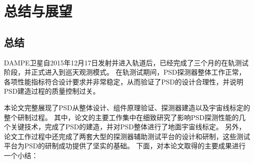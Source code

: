 
\chapter{总结与展望}
\label{ch:conclusion}

\section{总结}

DAMPE卫星自2015年12月17日发射并进入轨道后，已经完成了三个月的在轨测试阶段，并正式进入到巡天观测模式。
在轨测试期间，PSD探测器整体工作正常，各项性能指标符合设计要求并非常稳定，从而验证了PSD的设计合理性，并说明PSD建造过程的质量控制过关。

本论文完整展现了PSD从整体设计、组件原理验证、探测器建造以及宇宙线标定的整个研制过程。
其中，论文的主要工作集中在细致研究了影响PSD探测性能的几个关键技术，完成了PSD的建造，并对PSD整体进行了地面宇宙线标定。
另外，论文工作过程中还完成了两套大型的探测器辅助测试平台的设计和研制，这些测试平台为PSD的研制成功提供了坚实的基础。
下面，对本论文取得的主要成果进行一个小结：
